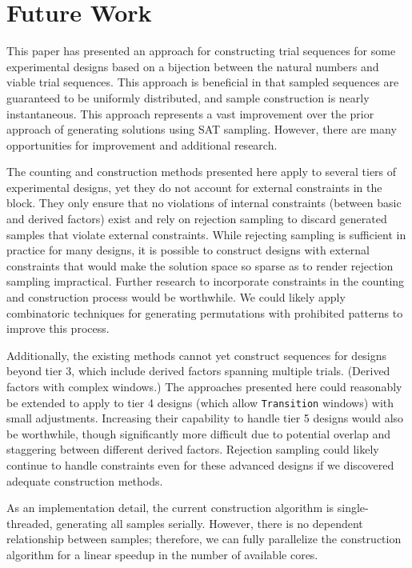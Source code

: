 
\chapter{Future Work}

This paper has presented an approach for constructing trial sequences for some experimental designs based on a bijection between the natural numbers and viable trial sequences. This approach is beneficial in that sampled sequences are guaranteed to be uniformly distributed, and sample construction is nearly instantaneous. This approach represents a vast improvement over the prior approach of generating solutions using SAT sampling. However, there are many opportunities for improvement and additional research.

The counting and construction methods presented here apply to several tiers of experimental designs, yet they do not account for external constraints in the block. They only ensure that no violations of internal constraints (between basic and derived factors) exist and rely on rejection sampling to discard generated samples that violate external constraints. While rejecting sampling is sufficient in practice for many designs, it is possible to construct designs with external constraints that would make the solution space so sparse as to render rejection sampling impractical. Further research to incorporate constraints in the counting and construction process would be worthwhile. We could likely apply combinatoric techniques for generating permutations with prohibited patterns to improve this process.

Additionally, the existing methods cannot yet construct sequences for designs beyond tier 3, which include derived factors spanning multiple trials. (Derived factors with complex windows.) The approaches presented here could reasonably be extended to apply to tier 4 designs (which allow \texttt{Transition} windows) with small adjustments. Increasing their capability to handle tier 5 designs would also be worthwhile, though significantly more difficult due to potential overlap and staggering between different derived factors. Rejection sampling could likely continue to handle constraints even for these advanced designs if we discovered adequate construction methods.

As an implementation detail, the current construction algorithm is single-threaded, generating all samples serially. However, there is no dependent relationship between samples; therefore, we can fully parallelize the construction algorithm for a linear speedup in the number of available cores.

